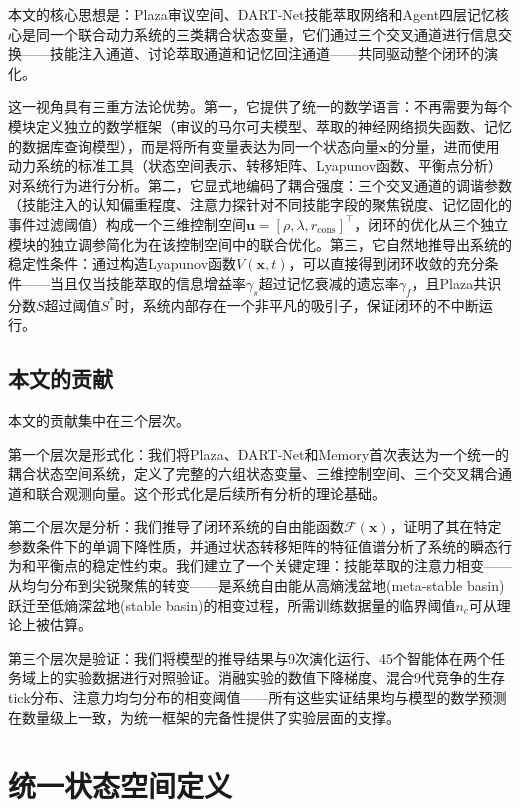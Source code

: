 \documentclass[twocolumn,10.5pt]{ctexart}
\begin{document}
本文的核心思想是：Plaza审议空间、DART-Net技能萃取网络和Agent四层记忆核心是同一个联合动力系统的三类耦合状态变量，它们通过三个交叉通道进行信息交换——技能注入通道、讨论萃取通道和记忆回注通道——共同驱动整个闭环的演化。

这一视角具有三重方法论优势。第一，它提供了统一的数学语言：不再需要为每个模块定义独立的数学框架（审议的马尔可夫模型、萃取的神经网络损失函数、记忆的数据库查询模型），而是将所有变量表达为同一个状态向量$\mathbf{x}$的分量，进而使用动力系统的标准工具（状态空间表示、转移矩阵、Lyapunov函数、平衡点分析）对系统行为进行分析。第二，它显式地编码了耦合强度：三个交叉通道的调谐参数（技能注入的认知偏重程度、注意力探针对不同技能字段的聚焦锐度、记忆固化的事件过滤阈值）构成一个三维控制空间$\mathbf{u} = [\rho, \lambda, r_{\text{cons}}]^\top$，闭环的优化从三个独立模块的独立调参简化为在该控制空间中的联合优化。第三，它自然地推导出系统的稳定性条件：通过构造Lyapunov函数$V(\mathbf{x}, t)$，可以直接得到闭环收敛的充分条件——当且仅当技能萃取的信息增益率$\gamma_s$超过记忆衰减的遗忘率$\gamma_f$，且Plaza共识分数$S$超过阈值$S^*$时，系统内部存在一个非平凡的吸引子，保证闭环的不中断运行。

\subsection{本文的贡献}

本文的贡献集中在三个层次。

第一个层次是形式化：我们将Plaza、DART-Net和Memory首次表达为一个统一的耦合状态空间系统，定义了完整的六组状态变量、三维控制空间、三个交叉耦合通道和联合观测向量。这个形式化是后续所有分析的理论基础。

第二个层次是分析：我们推导了闭环系统的自由能函数$\mathcal{F}(\mathbf{x})$，证明了其在特定参数条件下的单调下降性质，并通过状态转移矩阵的特征值谱分析了系统的瞬态行为和平衡点的稳定性约束。我们建立了一个关键定理：技能萃取的注意力相变——从均匀分布到尖锐聚焦的转变——是系统自由能从高熵浅盆地(meta-stable basin)跃迁至低熵深盆地(stable basin)的相变过程，所需训练数据量的临界阈值$n_c$可从理论上被估算。

第三个层次是验证：我们将模型的推导结果与9次演化运行、45个智能体在两个任务域上的实验数据进行对照验证。消融实验的数值下降梯度、混合9代竞争的生存tick分布、注意力均匀分布的相变阈值——所有这些实证结果均与模型的数学预测在数量级上一致，为统一框架的完备性提供了实验层面的支撑。

\section{统一状态空间定义}
\end{document}
